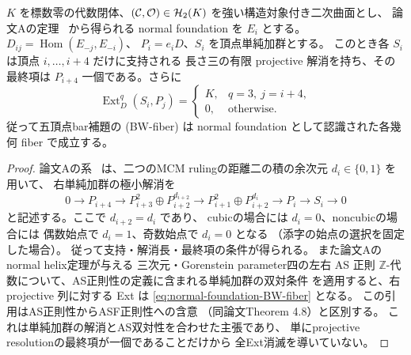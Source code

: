 \begin{lemma}
\label{lem:normal-foundation-BW-fiber}
$K$ を標数零の代数閉体、$(\mathcal C,\mathcal O)\in\mathcal H_2(K)$
を強い構造対象付き二次曲面とし、
論文Aの定理~\cite[\texttt{thm:normal-helix}]{QuadricIntrinsic2026}
から得られる normal foundation を $E_i$ とする。
$D_{ij}=\operatorname{Hom}(E_{-j},E_{-i})$、
$P_i=e_iD$、$S_i$ を頂点単純加群とする。
このとき各 $S_i$ は頂点 $i,\ldots,i+4$ だけに支持される
長さ三の有限 projective 解消を持ち、その最終項は
$P_{i+4}$ 一個である。さらに
\[
 \operatorname{Ext}_{D}^{q}(S_i,P_j)=
 \begin{cases}
 K,&q=3,\ j=i+4,\\
 0,&\text{otherwise}.
 \end{cases}
 \tag{BW-normal}\label{eq:normal-foundation-BW-fiber}
\]
従って五頂点bar補題の (BW-fiber) は
normal foundation として認識された各幾何 fiber で成立する。
\end{lemma}
\begin{proof}
論文Aの系~
\cite[\texttt{cor:normal-cubic-defect}]{QuadricIntrinsic2026}
は、二つのMCM rulingの距離二の積の余次元 $d_i\in\{0,1\}$ を用いて、
右単純加群の極小解消を
\[
 0\longrightarrow P_{i+4}
 \longrightarrow P_{i+3}^{2}\oplus P_{i+2}^{d_{i+2}}
 \longrightarrow P_{i+1}^{2}\oplus P_{i+2}^{d_i}
 \longrightarrow P_i\longrightarrow S_i\longrightarrow0
\]
と記述する。ここで $d_{i+2}=d_i$ であり、
cubicの場合には $d_i=0$、noncubicの場合には
偶数始点で $d_i=1$、奇数始点で $d_i=0$ となる
（添字の始点の選択を固定した場合）。
従って支持・解消長・最終項の条件が得られる。
また論文Aの normal helix定理が与える
三次元・Gorenstein parameter四の左右 AS 正則
$\mathbb Z$-代数について、AS正則性の定義に含まれる単純加群の双対条件
\cite[Definition 4.2, (ASR1)--(ASR2)]{MN2025}
を適用すると、右 projective 列に対する
Ext は \eqref{eq:normal-foundation-BW-fiber} となる。
この引用はAS正則性からASF正則性への含意
（同論文Theorem 4.8）と区別する。
これは単純加群の解消とAS双対性を合わせた主張であり、
単にprojective resolutionの最終項が一個であることだけから
全Ext消滅を導いていない。
\end{proof}

